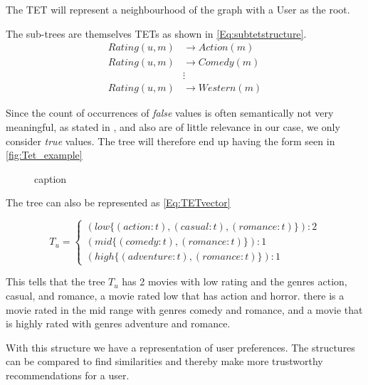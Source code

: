 The TET will represent a neighbourhood of the graph with a User as the root.

The sub-trees are themselves TETs as shown in \autoref{Eq:subtetstructure}.
\begin{equation}\label{Eq:subtetstructure}
\begin{aligned}
Rating(u,m)& \longrightarrow Action(m) \\
Rating(u,m)& \longrightarrow Comedy(m)\\
& \vdots \\
Rating(u,m)& \longrightarrow Western(m)
\end{aligned}
\end{equation}

Since the count of occurrences of \textit{false} values is often semantically not very meaningful, as stated in \cite{jaeger2019counts}, and also are of little relevance in our case, we only consider \textit{true} values. The tree will therefore end up having the form seen in \autoref{fig:Tet_example}

\begin{figure}[H]
    \centering
    \begin{adjustbox}{width=0.5\textwidth}
    
    \end{adjustbox}
    \caption{caption}
    \label{fig:Tet_example}
\end{figure}


The tree can also be represented as \autoref{Eq:TETvector}

\begin{equation}\label{Eq:TETvector}
    T_u=
    \begin{cases}
      (low \{(action:t),(casual:t), (romance:t)\}):2 \\
      (mid \{(comedy:t),(romance:t)\}):1 \\
      (high\{(adventure:t),(romance:t)\}):1
    \end{cases}
\end{equation}

This tells that the tree $T_u$ has 2 movies with low rating and the genres action, casual, and romance, a movie rated low that has action and horror. there is a movie rated in the mid range with genres comedy and romance, and a movie that is highly rated with genres adventure and romance.

With this structure we have a representation of user preferences.
The structures can be compared to find similarities and thereby make more trustworthy recommendations for a user.
